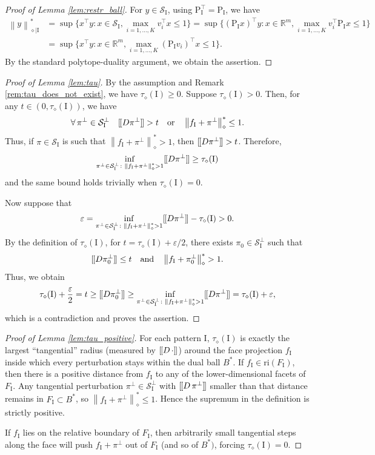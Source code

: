 \documentclass[12pt]{amsart}
\numberwithin{equation}{section}
\numberwithin{equation}{section}
\theoremstyle{definition}
\newcommand{\R}{\mathbb{R}}
\newcommand{\I}{\mathrm{I}}
\newcommand{\polyd}[1]{\left\|#1\right\|^\ast_\diamond}
\newcommand{\polydr}[2]{\left\|#1\right\|^\ast_{\diamond\mid #2}}
\newcommand{\PP}{\mathrm{P}}
\renewcommand{\SS}{\mathcal{S}}
\newcommand{\cnorm}[1]{[\mkern-1.5mu[#1]\mkern-1.5mu]}
\begin{document}
\begin{proof}[Proof of Lemma \ref{lem:restr_ball}]
	For $y\in\SS_{\I}$, using $\PP_{\I}^\top=\PP_{\I}$, we have 
	\begin{align*}
		\polydr{y}{\I} &= \sup\{x^\top y\colon x\in \SS_{\I}, \max_{i=1,\ldots,K} v_i^\top x\leq 1\} = \sup\{(\PP_{\I} x)^\top y\colon x\in \R^m, \max_{i=1,\ldots,K} v_i^\top \PP_{\I} x\leq 1\}  \\
		&=\sup\{x^\top y\colon x\in \R^m, \max_{i=1,\ldots,K} (\PP_{\I} v_i)^\top x\leq 1\}.
	\end{align*}
	By the standard polytope-duality argument, we obtain the assertion.
\end{proof}

\begin{proof}[Proof of Lemma \ref{lem:tau}]
	By the assumption and Remark \ref{rem:tau_does_not_exist}, we have $\tau_\diamond(\I)\geq 0$. 
	Suppose $\tau_\diamond(\I)>0$. Then, for any $t\in(0,\tau_\diamond(\I))$, we have 
	\[
	\forall\,\pi^\bot\in\SS_\I^\bot\quad\cnorm{D \pi^\bot}> t\quad\mbox{or}\quad\polyd{f_\I+\pi^\bot}\leq 1.
	\]
	Thus, if $\pi\in\SS_\I$ is such that $\polyd{f_\I+\pi^\bot}> 1$, then $\cnorm{D \pi^\bot}> t$.
	Therefore, 
	\[
	\inf_{\pi^\bot\in\SS_\I^\bot\colon \polyd{f_\I+\pi^\bot}> 1} \cnorm{D \pi^\bot} \geq  \tau_\diamond(\I) 
	\]
	and the same bound holds trivially when $\tau_\diamond(\I)=0$. 
	
	Now suppose that 
	\[
	\varepsilon = \inf_{\pi^\bot\in\SS_\I^\bot\colon \polyd{f_\I+\pi^\bot}> 1} \cnorm{D \pi^\bot} - \tau_\diamond(\I)>0.  
	\]
	By the definition of $\tau_\diamond(\I)$, for $t=\tau_\diamond(\I)+\varepsilon/2$, there exists $\pi_0\in \SS_\I^\bot$ such that 
	\[
	\cnorm{D \pi_0^\bot}\leq t\quad\mbox{and}\quad \polyd{f_\I+\pi_0^\bot}> 1.
	\]
	Thus, we obtain 
	\begin{align*}
		\tau_\diamond(\I)+\frac{\varepsilon}{2} = t \geq \cnorm{D \pi_0^\bot} 
		\geq \inf_{\pi^\bot\in\SS_\I^\bot\colon \polyd{f_\I+\pi^\bot}> 1} \cnorm{D \pi^\bot} = \tau_\diamond(\I)+\varepsilon,
	\end{align*}
	which is a contradiction and proves the assertion. 
\end{proof}

\begin{proof}[Proof of Lemma \ref{lem:tau_positive}]
	For each pattern $\I$,  $\tau_\diamond(\I)$ is exactly the largest “tangential” radius (measured by $\cnorm{ D\,\cdot}$) around the face projection $f_\I$ inside which every perturbation stays within the dual ball $B^\ast$. If $f_\I\in\mathrm{ri}(F_\I)$, then there is a positive distance from $f_\I$ to any of the lower-dimensional facets of $F_\I$. Any tangential perturbation $\pi^\bot\in\SS_{\I}^\bot$ with $\cnorm{ D\,\pi^\bot}$ smaller than that distance remains in $F_\I\subset B^\ast$, so $\polyd{f_\I+\pi^\bot}\leq 1$. Hence the supremum in the definition is strictly positive.
	
	If $f_\I$ lies on the relative boundary of $F_\I$, then arbitrarily small tangential steps along the face will push $f_\I+\pi^\bot$ out of $F_\I$ (and so of $B^\ast)$, forcing $\tau_\diamond(\I)=0$. 
\end{proof}
\end{document}
